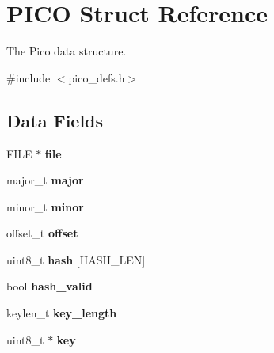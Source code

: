 \hypertarget{struct_p_i_c_o}{\section{P\+I\+C\+O Struct Reference}
\label{struct_p_i_c_o}
}


The Pico data structure.  




{\ttfamily \#include $<$pico\+\_\+defs.\+h$>$}

\subsection*{Data Fields}
\begin{DoxyCompactItemize}
\item 
\hypertarget{struct_p_i_c_o_a702945180aa732857b380a007a7e2a21}{F\+I\+L\+E $\ast$ {\bfseries file}}\label{struct_p_i_c_o_a702945180aa732857b380a007a7e2a21}

\item 
\hypertarget{struct_p_i_c_o_a0b5789abe4edbd046a600698215663e6}{major\+\_\+t {\bfseries major}}\label{struct_p_i_c_o_a0b5789abe4edbd046a600698215663e6}

\item 
\hypertarget{struct_p_i_c_o_a347436871e6350a933edc9ceb15cb420}{minor\+\_\+t {\bfseries minor}}\label{struct_p_i_c_o_a347436871e6350a933edc9ceb15cb420}

\item 
\hypertarget{struct_p_i_c_o_a82cd2bcc199f2eaecbf51052f9a9bd08}{offset\+\_\+t {\bfseries offset}}\label{struct_p_i_c_o_a82cd2bcc199f2eaecbf51052f9a9bd08}

\item 
\hypertarget{struct_p_i_c_o_a60fdfa8850d5a041ae231408f53e3f5f}{uint8\+\_\+t {\bfseries hash} \mbox{[}H\+A\+S\+H\+\_\+\+L\+E\+N\mbox{]}}\label{struct_p_i_c_o_a60fdfa8850d5a041ae231408f53e3f5f}

\item 
\hypertarget{struct_p_i_c_o_afa401be77c226d1947a0ca7e6601eb3a}{bool {\bfseries hash\+\_\+valid}}\label{struct_p_i_c_o_afa401be77c226d1947a0ca7e6601eb3a}

\item 
\hypertarget{struct_p_i_c_o_a7eab54bd1b64e159a76f4514e74ccf6b}{keylen\+\_\+t {\bfseries key\+\_\+length}}\label{struct_p_i_c_o_a7eab54bd1b64e159a76f4514e74ccf6b}

\item 
\hypertarget{struct_p_i_c_o_a302e2291dbff57f770bf469af498ec3a}{uint8\+\_\+t $\ast$ {\bfseries key}}\label{struct_p_i_c_o_a302e2291dbff57f770bf469af498ec3a}


\end{DoxyCompactItemize}
